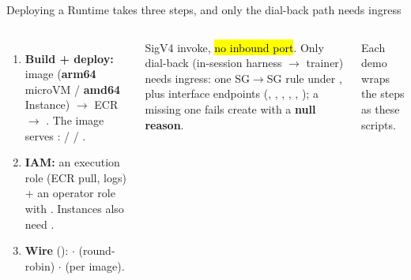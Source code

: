 \begin{frame}{Deploying a Runtime takes three steps, and only the dial-back path needs ingress}
\begin{columns}[T]
\begin{enumerate}\footnotesize\setlength{\itemsep}{1mm}
\item \textbf{Build + deploy:} image (\textbf{arm64} microVM / \textbf{amd64} Instance) $\rightarrow$ ECR $\rightarrow$ . The image serves :  /  / .
\item \textbf{IAM:} an execution role (ECR pull, logs) + an operator role with . Instances also need .
\item \textbf{Wire} ():  $\cdot$  (round-robin) $\cdot$  (per image).
\end{enumerate}
{\footnotesize\raggedright SigV4 invoke, \hl{no inbound port}. Only dial-back (in-session harness $\rightarrow$ trainer) needs ingress: one SG$\rightarrow$SG rule under , plus interface endpoints (, , , , , ); a missing one fails create with a \textbf{null reason}.\par}
\vspace{3mm}
\centering
{}
\par{\scriptsize\color{inkmuted}Each demo wraps the steps as these scripts.\par}
\end{columns}
\end{frame}


